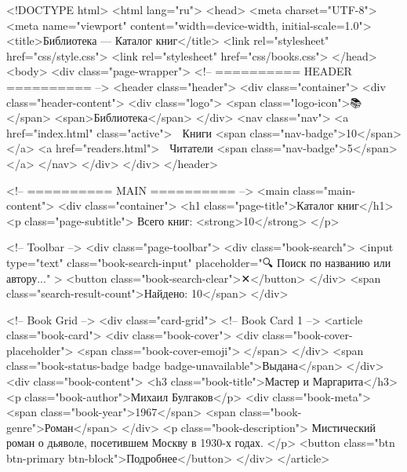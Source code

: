 <!DOCTYPE html>
<html lang="ru">
<head>
  <meta charset="UTF-8">
  <meta name="viewport" content="width=device-width, initial-scale=1.0">
  <title>Библиотека — Каталог книг</title>
  <link rel="stylesheet" href="css/style.css">
  <link rel="stylesheet" href="css/books.css">
</head>
<body>
  <div class="page-wrapper">
    <!-- ========== HEADER ========== -->
    <header class="header">
      <div class="container">
        <div class="header-content">
          <div class="logo">
            <span class="logo-icon">📚</span>
            <span>Библиотека</span>
          </div>
          <nav class="nav">
            <a href="index.html" class="active">
              📖 Книги
              <span class="nav-badge">10</span>
            </a>
            <a href="readers.html">
              👤 Читатели
              <span class="nav-badge">5</span>
            </a>
          </nav>
        </div>
      </div>
    </header>

    <!-- ========== MAIN ========== -->
    <main class="main-content">
      <div class="container">
        <h1 class="page-title">Каталог книг</h1>
        <p class="page-subtitle">
          Всего книг: <strong>10</strong>
        </p>

        <!-- Toolbar -->
        <div class="page-toolbar">
          <div class="book-search">
            <input 
              type="text" 
              class="book-search-input" 
              placeholder="🔍 Поиск по названию или автору..."
            >
            <button class="book-search-clear">✕</button>
          </div>
          <span class="search-result-count">Найдено: 10</span>
        </div>

        <!-- Book Grid -->
        <div class="card-grid">
          <!-- Book Card 1 -->
          <article class="book-card">
            <div class="book-cover">
              <div class="book-cover-placeholder">
                <span class="book-cover-emoji">📖</span>
              </div>
              <span class="book-status-badge badge badge-unavailable">Выдана</span>
            </div>
            <div class="book-content">
              <h3 class="book-title">Мастер и Маргарита</h3>
              <p class="book-author">Михаил Булгаков</p>
              <div class="book-meta">
                <span class="book-year">1967</span>
                <span class="book-genre">Роман</span>
              </div>
              <p class="book-description">
                Мистический роман о дьяволе, посетившем Москву в 1930-х годах.
              </p>
              <button class="btn btn-primary btn-block">Подробнее</button>
            </div>
          </article>

